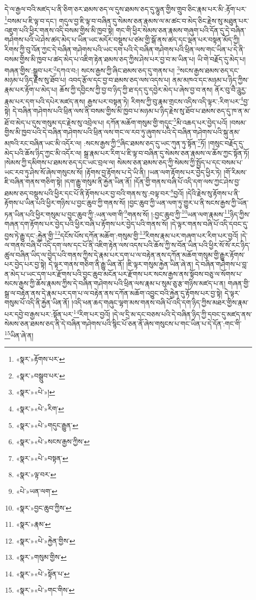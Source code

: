དེ་ལ་རྒྱལ་བའི་མཛད་པ་ནི་ཅིག་ཅར་ཐམས་ཅད་ལ་དུས་ཐམས་ཅད་དུ་ལྷུན་གྱིས་གྲུབ་ཅིང་རྣམ་པར་མི་:རྟོག་པར་\footnote{«སྣར་»རྟོགས་པར་}བསམ་པ་ཇི་ལྟ་བ་དང་། གདུལ་བྱ་ཇི་ལྟ་བ་བཞིན་དུ་སེམས་ཅན་རྣམས་ལ་མ་ཚང་བ་མེད་ཅིང་རྗེས་སུ་མཐུན་པར་འཇུག་པའི་ཕྱིར་གནས་འདི་བསམ་གྱིས་མི་ཁྱབ་སྟེ། གང་གི་ཕྱིར་སེམས་ཅན་རྣམས་གཞུག་པའི་དོན་དུ་དེ་བཞིན་གཤེགས་པའི་ཡེ་ཤེས་ཚད་མེད་པ་ཡིན་ཡང་མདོར་བསྡུས་པ་ཙམ་གྱི་སྒོ་ནས་ཚད་དང་ལྡན་པར་བསྟན་མོད་ཀྱི། རིགས་ཀྱི་བུ་འོན་ཀྱང་དེ་བཞིན་གཤེགས་པའི་ཡང་དག་པའི་དེ་བཞིན་གཤེགས་པའི་ཕྲིན་ལས་གང་ཡིན་པ་དེ་ནི་བསམ་གྱིས་མི་ཁྱབ་པ་ཚད་མེད་པ་འཇིག་རྟེན་ཐམས་ཅད་ཀྱིས་ཤེས་པར་བྱ་བ་མ་ཡིན་པ། ཡི་གེ་བརྗོད་དུ་མེད་པ། གཞན་གྱིས་:སྒྲུབ་པར་\footnote{«སྣར་»བསྒྲུབ་པར་}དཀའ་བ:། སངས་རྒྱས་ཀྱི་ཞིང་ཐམས་ཅད་དུ་གནས་པ། \footnote{«སྣར་»«པེ་»།  }སངས་རྒྱས་ཐམས་ཅད་དང་མཉམ་པ་ཉིད་རྗེས་སུ་ཐོབ་པ། འབད་རྩོལ་དང་བྱ་བ་ཐམས་ཅད་ལས་འདས་པ། ནམ་མཁའ་དང་མཉམ་པ་ཉིད་ཀྱིས་རྣམ་པར་རྟོག་པ་མེད་པ། ཆོས་ཀྱི་དབྱིངས་ཀྱི་བྱ་བ་ཉིད་ཀྱི་ཐ་དད་དུ་དབྱེར་མེད་པ་ཞེས་བྱ་བ་ནས། ནོར་བུ་བཻ་ཌཱུརྱ་རྣམ་པར་དག་པའི་དཔེར་མཛད་ནས། རྒྱས་པར་བསྟན་ཏེ། རིགས་ཀྱི་བུ་རྣམ་གྲངས་འདིས་འདི་ལྟར་:རིག་པར་\footnote{«སྣར་»«པེ་»རིག་}བྱ་སྟེ། དེ་བཞིན་གཤེགས་པའི་ཕྲིན་ལས་ནི་བསམ་གྱིས་མི་ཁྱབ་པ་མཉམ་པ་ཉིད་རྗེས་སུ་ཐོབ་པ་ཐམས་ཅད་དུ་ཁ་ན་མ་ཐོ་བ་མེད་པ་དུས་གསུམ་དང་རྗེས་སུ་འབྲེལ་པ། དཀོན་མཆོག་གསུམ་གྱི་གདུང་\footnote{«སྣར་»«པེ་»གདུང་རྒྱུན་}མི་འཆད་པར་བྱེད་པའོ། །བསམ་གྱིས་མི་ཁྱབ་པའི་དེ་བཞིན་གཤེགས་པའི་ཕྲིན་ལས་གང་ལ་རབ་ཏུ་ཞུགས་པའི་དེ་བཞིན་གཤེགས་པའི་སྐུ་ནམ་མཁའི་རང་བཞིན་ཡང་མི་འདོར་ལ། :སངས་རྒྱས་ཀྱི་\footnote{«སྣར་»«པེ་»སངས་རྒྱས་ཀྱིས་}ཞིང་ཐམས་ཅད་དུ་ཡང་ཀུན་ཏུ་སྟོན་\footnote{«སྣར་»«པེ་»བསྟན་}ཏོ། །གསུང་བརྗོད་དུ་མེད་པའི་ཆོས་ཉིད་ཀྱང་མི་འདོར་ལ། སྒྲ་རྣམ་པར་རིག་པ་ཇི་ལྟ་བ་བཞིན་དུ་སེམས་ཅན་རྣམས་ལ་ཆོས་ཀྱང་སྟོན་ཏོ། །སེམས་ཀྱི་དམིགས་པ་ཐམས་ཅད་དང་ཡང་བྲལ་ལ། སེམས་ཅན་ཐམས་ཅད་ཀྱི་སེམས་ཀྱི་སྤྱོད་པ་དང་བསམ་པ་ཡང་རབ་ཏུ་ཤེས་སོ་ཞེས་གསུངས་སོ། །རྟོགས་བྱ་རྟོགས་པ་དེ་ཡི་ནི། །ཡན་ལག་རྟོགས་པར་བྱེད་ཕྱིར་ཏེ། །གོ་རིམས་ཇི་བཞིན་གནས་གཅིག་སྟེ། །དག་རྒྱུ་གསུམ་ནི་རྐྱེན་ཡིན་ནོ། །དོན་གྱི་གནས་བཞི་པོ་འདི་དག་ལས་ཀྱང་ཤེས་བྱ་ཐམས་ཅད་བསྡུས་པའི་ཕྱིར་དང་པོ་ནི་རྟོགས་པར་བྱ་བའི་གནས་སུ་:བལྟ་བར་\footnote{«སྣར་»ལྟ་བར་}བྱའོ། །དེའི་རྗེས་སུ་རྟོགས་པ་ནི་རྟོགས་པ་ཡིན་པའི་ཕྱིར་གཉིས་པ་བྱང་ཆུབ་ཀྱི་གནས་སོ། །བྱང་ཆུབ་ཀྱི་ཡན་ལག་ཏུ་གྱུར་པ་ནི་སངས་རྒྱས་ཀྱི་ཡོན་ཏན་ཡིན་པའི་ཕྱིར་གསུམ་པ་བྱང་ཆུབ་ཀྱི་:ཡན་ལག་གི་\footnote{«པེ་»ཡན་ལག་}གནས་སོ། །:བྱང་ཆུབ་ཀྱི་\footnote{«སྣར་»བྱང་ཆུབ་ཀྱིས་}ཡན་ལག་རྣམས་\footnote{«སྣར་»རྣམ་}ཉིད་ཀྱིས་གཞན་དག་རྟོགས་པར་བྱེད་པའི་ཕྱིར་བཞི་པ་རྟོགས་པར་བྱེད་པའི་གནས་སོ། །དེ་ལྟར་གནས་བཞི་པོ་འདི་དབང་དུ་བྱས་ཏེ་རྒྱུ་དང་:རྐྱེན་གྱི་\footnote{«སྣར་»«པེ་»རྐྱེན་གྱིས་}དངོས་པོས་དཀོན་མཆོག་:གསུམ་གྱི་\footnote{«སྣར་»གསུམ་གྱིས་}རིགས་རྣམ་པར་གཞག་པར་རིག་པར་བྱའོ། །དེ་ལ་གནས་བཞི་པོ་འདི་དག་ལས་དང་པོ་ནི་འཇིག་རྟེན་ལས་འདས་པའི་ཆོས་ཀྱི་ས་བོན་ཡིན་པའི་ཕྱིར་སོ་སོ་རང་ཉིད་ཚུལ་བཞིན་ཡིད་ལ་བྱེད་པའི་གནས་ཀྱིས་དེ་རྣམ་པར་དག་པ་ལ་བརྟེན་ནས་དཀོན་མཆོག་གསུམ་གྱི་རྒྱུར་རྟོགས་པར་བྱེད་པར་བྱ་སྟེ། དེ་ལྟར་གནས་གཅིག་ནི་རྒྱུ་ཡིན་ནོ། །ཇི་ལྟར་གསུམ་རྐྱེན་ཡིན་ཞེ་ན། དེ་བཞིན་གཤེགས་པ་བླ་ན་མེད་པ་ཡང་དག་པར་རྫོགས་པའི་བྱང་ཆུབ་མངོན་པར་རྫོགས་པར་སངས་རྒྱས་ནས་སྟོབས་བཅུ་ལ་སོགས་པ་སངས་རྒྱས་ཀྱི་ཆོས་རྣམས་ཀྱིས་དེ་བཞིན་གཤེགས་པའི་ཕྲིན་ལས་རྣམ་པ་སུམ་ཅུ་རྩ་གཉིས་མཛད་པ་ན། གཞན་གྱི་སྒྲ་ལ་བརྟེན་ནས་དེ་རྣམ་པར་དག་པ་ལ་བརྟེན་ནས་དཀོན་མཆོག་འབྱུང་བའི་རྐྱེན་དུ་རྟོགས་པར་བྱ་སྟེ། དེ་ལྟར་གསུམ་པོ་འདི་ནི་རྐྱེན་ཡིན་ནོ། །འདི་ཕན་ཆད་གཞུང་ལྷག་མས་གནས་བཞི་པོ་འདི་དག་ཉིད་ཀྱིས་མཐར་གྱིས་རྣམ་པར་དབྱེ་བ་རྒྱས་པར་:སྟོན་པར་\footnote{«སྣར་»«པེ་»སྟོན་པ་}རིག་པར་བྱའོ། །དེ་ལ་དྲི་མ་དང་བཅས་པའི་དེ་བཞིན་ཉིད་ཀྱི་དབང་དུ་མཛད་ནས་སེམས་ཅན་ཐམས་ཅད་ནི་དེ་བཞིན་གཤེགས་པའི་སྙིང་པོ་ཅན་ནོ་ཞེས་གསུངས་པ་གང་ཡིན་པ་དེ་དོན་:གང་གི་\footnote{«སྣར་»«པེ་»གང་གིས་}ཡིན་ཞེ་ན། 